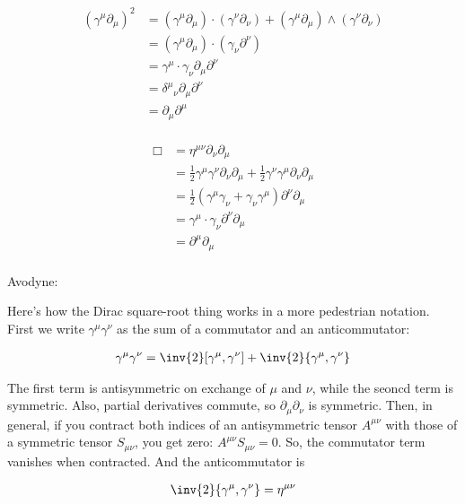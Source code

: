 \documentclass{article}
\begin{document}
%


\begin{align*}
(\gamma^\mu \partial_\mu)^2 
&= 
(\gamma^\mu \partial_\mu) \cdot (\gamma^\nu \partial_\nu)
+ (\gamma^\mu \partial_\mu) \wedge (\gamma^\nu \partial_\nu) \\
&= (\gamma^\mu \partial_\mu) \cdot (\gamma_\nu \partial^\nu) \\
&= \gamma^\mu \cdot \gamma_\nu \partial_\mu \partial^\nu \\
&= {\delta^\mu}_\nu \partial_\mu \partial^\nu \\
&= \partial_\mu \partial^\mu \\
\end{align*}


\begin{align*}
\Box
&= \eta ^{\mu\nu}\partial_{\nu}  \partial_{\mu}  \\
&= \frac{1}{2}\gamma^{\mu}\gamma^{\nu} \partial_{\nu}  \partial_{\mu} +\frac{1}{2}\gamma^{\nu}\gamma^{\mu} \partial_{\nu}  \partial_{\mu} \\
&= \frac{1}{2}\left(\gamma^{\mu}\gamma_{\nu} + \gamma_{\nu}\gamma^{\mu} \right) \partial^{\nu} \partial_{\mu} \\
&= \gamma^\mu \cdot \gamma_\nu \partial^{\nu} \partial_{\mu} \\
&= \partial^{\mu} \partial_{\mu} \\
\end{align*}


Avodyne:

Here's how the Dirac square-root thing works in a more pedestrian notation.  First we write $\gamma^\mu\gamma^\nu$ as the sum of a commutator and an anticommutator:

\begin{align*}
\gamma^\mu \gamma^\nu = \inv{2}[\gamma^\mu,\gamma^\nu] + \inv{2} \{\gamma^\mu,\gamma^\nu\}
\end{align*}

The first term is antisymmetric on exchange of $\mu$ and $\nu$, while the seoncd term is symmetric.  Also, partial derivatives commute, so $\partial_\mu\partial_\nu$ is symmetric.  Then, in general, if you contract both indices of an antisymmetric tensor $A^{\mu\nu}$ with those of a symmetric tensor $S_{\mu\nu}$, you get zero: $A^{\mu\nu}S_{\mu\nu}=0$.  
So, the commutator term vanishes when contracted.  And the anticommutator is 

\begin{align*}
\inv{2}\{\gamma^\mu,\gamma^\nu\}=\eta^{\mu\nu}
\end{align*}



\end{document}
